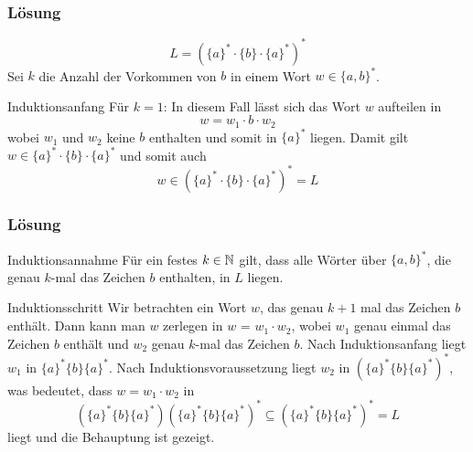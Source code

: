 \begin{frame}
	\frametitle{Lösung}
	$$L = (\{a\}^\ast \cdot \{b\} \cdot \{a\}^\ast)^\ast$$
	Sei $k$ die Anzahl der Vorkommen von $b$ in einem Wort $w \in \{a, b\}^\ast$.
	\begin{block}{Induktionsanfang}  \pause
		Für $k = 1$: In diesem Fall lässt sich das Wort $w$ aufteilen in $$w = w_1 \cdot b \cdot w_2$$ wobei $w_1$ und $w_2$ keine $b$ enthalten und somit in $\{a\}^\ast$ liegen. Damit gilt $w \in \{a\}^\ast \cdot \{b\} \cdot \{a\}^\ast$ und somit auch $$w \in (\{a\}^\ast \cdot \{b\} \cdot \{a\}^\ast)^\ast = L$$
	\end{block}
\end{frame}

\begin{frame}
	\frametitle{Lösung}
	\begin{block}{Induktionsannahme}  \pause
		Für ein festes $k \in \mathbb{N}$ gilt, dass alle Wörter über $\{a, b\}^\ast$, die genau $k$-mal das Zeichen $b$ enthalten, in $L$ liegen.
	\end{block} \pause
	\begin{block}{Induktionsschritt}  \pause
		Wir betrachten ein Wort $w$, das genau $k + 1$ mal das Zeichen $b$ enthält. Dann kann man $w$ zerlegen in $w$ = $w_1 \cdot w_2$, wobei $w_1$ genau einmal das Zeichen $b$ enthält und $w_2$ genau $k$-mal das Zeichen $b$. \pause Nach Induktionsanfang liegt $w_1$ in $\{a\}^\ast \{b\}\{a\}^\ast$. Nach Induktionsvoraussetzung liegt $w_2$ in $(\{a\}^\ast \{b\}\{a\}^\ast )^\ast$, was bedeutet, dass $w = w_1 \cdot w_2$ in $$(\{a\}^\ast \{b\}\{a\}^\ast )(\{a\}^\ast \{b\}\{a\}^\ast )^\ast \subseteq (\{a\}^\ast \{b\}\{a\}^\ast )^\ast = L$$ liegt und die Behauptung ist gezeigt.
	\end{block}
\end{frame}

